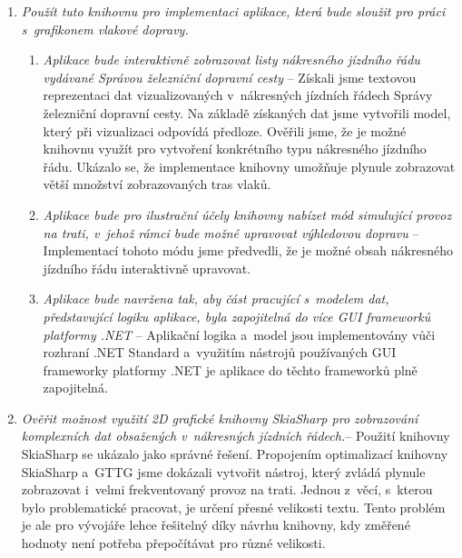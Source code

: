 \begin{enumerate}[label=\color{goalcolor}\textbf{G{\arabic*}}]
\item \textit{Použít tuto knihovnu pro implementaci aplikace, která bude sloužit pro práci s~grafikonem vlakové dopravy.}
	\begin{enumerate}[label=\color{goalcolor}\textbf{\alph*})]
		\item \textit{Aplikace bude interaktivně zobrazovat listy nákresného jízdního řádu vydávané Správou železniční dopravní cesty} -- Získali jsme textovou reprezentaci dat vizualizovaných v~nákresných jízdních řádech Správy železniční dopravní cesty. Na základě získaných dat jsme vytvořili model, který při vizualizaci odpovídá předloze. Ověřili jsme, že je možné knihovnu využít pro vytvoření konkrétního typu nákresného jízdního řádu. Ukázalo se, že implementace knihovny umožňuje plynule zobrazovat větší množství zobrazovaných tras vlaků.
		\item \textit{Aplikace bude pro ilustrační účely knihovny nabízet mód simulující provoz na trati, v~jehož rámci bude možné upravovat výhledovou dopravu} -- Implementací tohoto módu jsme předvedli, že je možné obsah nákresného jízdního řádu interaktivně upravovat.
		\item \textit{Aplikace bude navržena tak, aby část pracující s~modelem dat, představující logiku aplikace, byla zapojitelná do více GUI frameworků platformy .NET} -- Aplikační logika a~model jsou implementovány vůči rozhraní .NET Standard a~využitím nástrojů používaných GUI frameworky platformy .NET je aplikace do těchto frameworků plně  zapojitelná.
	\end{enumerate}

	\item \textit{Ověřit možnost využití 2D grafické knihovny SkiaSharp pro zobrazování komplexních dat obsažených v~nákresných jízdních řádech.}\newline -- Použití knihovny SkiaSharp se ukázalo jako správné řešení. Propojením optimalizací knihovny SkiaSharp a~GTTG jsme dokázali vytvořit nástroj, který zvládá plynule zobrazovat i~velmi frekventovaný provoz na trati. Jednou z~věcí, s~kterou bylo problematické pracovat, je určení přesné velikosti textu. Tento problém je ale pro vývojáře lehce řešitelný díky návrhu knihovny, kdy změřené hodnoty není potřeba přepočítávat pro různé velikosti.
\end{enumerate}

